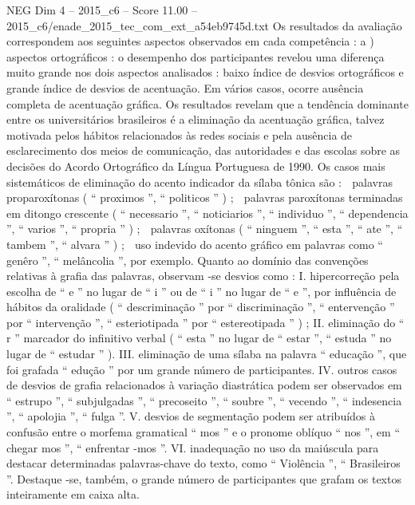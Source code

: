 \begin{textsample}{NEG Dim 4 – 2015\_c6 – Score 11.00 – 2015\_c6/enade\_2015\_tec\_com\_ext\_a54eb9745d.txt}
Os resultados da avaliação correspondem aos seguintes aspectos observados em cada competência : a ) aspectos ortográficos : o desempenho dos participantes revelou uma diferença muito grande nos dois aspectos analisados : baixo índice de desvios ortográficos e grande índice de desvios de acentuação.
Em vários casos, ocorre ausência completa de acentuação gráfica.
Os resultados revelam que a tendência dominante entre os universitários brasileiros é a eliminação da acentuação gráfica, talvez motivada pelos hábitos relacionados às redes sociais e pela ausência de esclarecimento dos meios de comunicação, das autoridades e das escolas sobre as decisões do Acordo Ortográfico da Língua Portuguesa de 1990.
Os casos mais sistemáticos de eliminação do acento indicador da sílaba tônica são :  palavras proparoxítonas ( “ proximos ”, “ politicos ” ) ;  palavras paroxítonas terminadas em ditongo crescente ( “ necessario ”, “ noticiarios ”, “ individuo ”, “ dependencia ”, “ varios ”, “ propria ” ) ;  palavras oxítonas ( “ ninguem ”, “ esta ”, “ ate ”, “ tambem ”, “ alvara ” ) ;  uso indevido do acento gráfico em palavras como “ genêro ”, “ melâncolia ”, por exemplo.
Quanto ao domínio das convenções relativas à grafia das palavras, observam -se desvios como : I. hipercorreção pela escolha de “ e ” no lugar de “ i ” ou de “ i ” no lugar de “ e ”, por influência de hábitos da oralidade ( “ descriminação ” por “ discriminação ”, “ entervenção ” por “ intervenção ”, “ esteriotipada ” por “ estereotipada ” ) ; II. eliminação do “ r ” marcador do infinitivo verbal ( “ esta ” no lugar de “ estar ”, “ estuda ” no lugar de “ estudar ” ).
III. eliminação de uma sílaba na palavra “ educação ”, que foi grafada “ edução ” por um grande número de participantes.
IV. outros casos de desvios de grafia relacionados à variação diastrática podem ser observados em “ estrupo ”, “ subjulgadas ”, “ precoseito ”, “ soubre ”, “ vecendo ”, “ indesencia ”, “ apolojia ”, “ fulga ”.
V. desvios de segmentação podem ser atribuídos à confusão entre o morfema gramatical “ mos ” e o pronome oblíquo “ nos ”, em “ chegar mos ”, “ enfrentar -mos ”.
VI. inadequação no uso da maiúscula para destacar determinadas palavras-chave do texto, como “ Violência ”, “ Brasileiros ”.
Destaque -se, também, o grande número de participantes que grafam os textos inteiramente em caixa alta.

\end{textsample}
